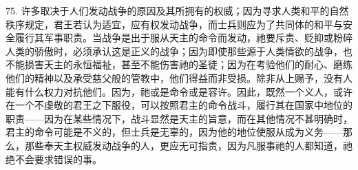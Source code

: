 75. 许多取决于人们发动战争的原因及其所拥有的权威；因为寻求人类和平的自然秩序规定，君王若认为适宜，应有权发动战争，而士兵则应为了共同体的和平与安全履行其军事职责。当战争是出于服从天主的命令而发动，祂要斥责、贬抑或粉碎人类的骄傲时，必须承认这是正义的战争；因为即使那些源于人类情欲的战争，也不能损害天主的永恒福祉，甚至不能伤害祂的圣徒；因为在考验他们的耐心、磨练他们的精神以及承受慈父般的管教中，他们得益而非受损。除非从上赐予，没有人能有什么权力对抗他们。因为，祂或是命令或是容许。因此，既然一个义人，或许在一个不虔敬的君王之下服役，可以按照君主的命令战斗，履行其在国家中地位的职责——因为在某些情况下，战斗显然是天主的旨意，而在其他情况不甚明确时，君主的命令可能是不义的，但士兵是无辜的，因为他的地位使服从成为义务——那么，那些奉天主权威发动战争的人，更应无可指责，因为凡服事祂的人都知道，祂绝不会要求错误的事。\par

